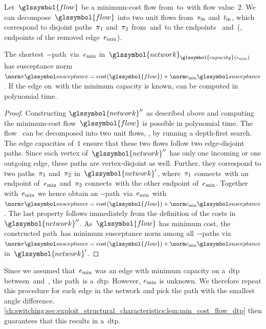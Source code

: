 Let~$\glssymbol{flow}$ be a minimum-cost flow from~\vertexa to~\vertexb with
flow value~$2$. We can decompose~$\glssymbol{flow}$ into two unit flows
from~$s_\mathrm{in}$ and~$t_\mathrm{in}$, which correspond to disjoint
paths~$\pi_1$ and~$\pi_2$ from~\source and~\sink to the endpoints~\vertexa
and~\vertexb (\ie, endpoints of the removed edge~$e_{\min}$).
% 
\begin{lemma}
    The shortest~\source-\sink-path~\pathu via~$e_{\min}$
    in~$\glssymbol{network}_{\glssymbol{capacity}(\edge_{\min})}$ has
    susceptance
    norm~$\bnorm{\pathu}=\flowcost(\glssymbol{flow})+\bnorm{\edge_{\min}}$. If
    the edge on~\pathu with the minimum capacity is known, \pathu can be
    computed in polynomial time.
    \label{ch:switching:sec:exploit_structural_characteristics:lem:min_cost_flow_dtp}
\end{lemma}
% 
\begin{proof}
    Constructing $\glssymbol{network}''$ as described above and computing the minimum-cost
    flow~$\glssymbol{flow}$ is possible in polynomial time. The
    flow~ can be
    decomposed into two unit flows, \eg, by running a depth-first search. The
    edge capacities of~$1$ ensure that these two flows follow two edge-disjoint
    paths. Since each vertex of~$\glssymbol{network}''$ has only one incoming or one
    outgoing edge, these paths are vertex-disjoint as well. Further, they
    correspond to two paths~$\pi_1$ and~$\pi_2$ in~$\glssymbol{network}'$,
    where~$\pi_1$ connects~\source with an endpoint of~$e_{\min}$
    and~$\pi_2$ connects~\sink with the other endpoint of~$e_{\min}$.
    Together with~$e_{\min}$ we hence obtain an
    \source-\sink-path~\paths via~$e_{\min}$ 
    with~$\bnorm{\pathu}=\flowcost(\glssymbol{flow})+\bnorm{\edge_{\min}}$. The last
    property follows immediately from the definition of the costs
    in~$\glssymbol{network}''$. As~$\glssymbol{flow}$ has minimum cost, the
    constructed path~\pathu has
    minimum susceptance norm among all~\source-\sink-paths
    via~$\bnorm{\pathu}=\flowcost(\glssymbol{flow})+\bnorm{\edge_{\min}}$
    in~$\glssymbol{network}'$.
\end{proof}

Since we assumed that~$e_{\min}$ was an edge with minimum capacity on
a~\gls{dtp} between~\source and~\sink, the path~\pathu is a~\gls{dtp}.
However, $e_{\min}$ is unknown. We therefore repeat this procedure for each
edge in the network and pick the path with the smallest angle difference.
\cref{ch:switching:sec:exploit_structural_characteristics:lem:min_cost_flow_dtp}
then guarantees that this results in a~\gls{dtp}.
% 
